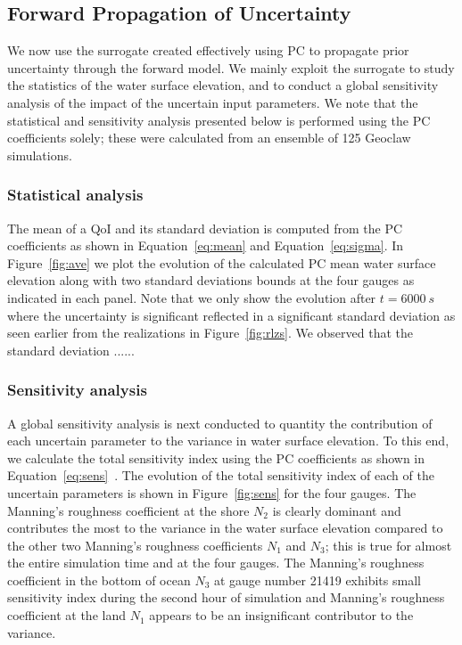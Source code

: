 \subsection{Forward Propagation of Uncertainty}
\label{sec:forward}
We now use the surrogate created effectively using PC to propagate prior 
uncertainty through the forward model. We mainly exploit the surrogate 
to study the statistics of the water surface elevation, and to conduct 
a global sensitivity analysis of the impact of the uncertain input parameters.
We note that the statistical and sensitivity analysis presented below 
is performed using the PC coefficients solely; these were calculated
from an ensemble of 125 Geoclaw simulations.
\subsubsection{Statistical analysis}
The mean of a QoI and its standard deviation is computed
from the PC coefficients as shown in Equation~\ref{eq:mean} and Equation~\ref{eq:sigma}. 
In Figure~\ref{fig:ave} we plot the evolution of
the calculated PC mean water surface elevation along with two standard deviations
bounds at the four gauges as indicated in each panel.  
Note that we only show the evolution after $t=6000~s$ where the uncertainty is significant
reflected in a significant standard deviation as seen earlier from the realizations in Figure~\ref{fig:rlzs}.
We observed that the standard deviation ...... 


         
        
\subsubsection{Sensitivity analysis}
A global sensitivity analysis is next conducted to quantity the contribution of each
uncertain parameter to the variance in water surface elevation. To this end, we calculate 
the total sensitivity index using the PC coefficients as shown in Equation~\ref{eq:sens}~\citep{Alexanderian2012,Sudret,Crestaux}. The evolution of the total sensitivity index
of each of the uncertain parameters is shown in Figure~\ref{fig:sens} for the four gauges. 
The Manning's roughness coefficient at the shore $N_2$ is clearly dominant and contributes
the most to the variance in the water surface elevation compared to the other two 
Manning's roughness coefficients $N_1$ and $N_3$; this is true for almost the entire simulation time
and at the four gauges. The Manning's roughness coefficient
in the bottom of ocean $N_{3}$ at gauge number 21419 exhibits small sensitivity index 
during the second hour of simulation and Manning's roughness coefficient
at the land $N_1$ appears to be an insignificant contributor
to the variance.

